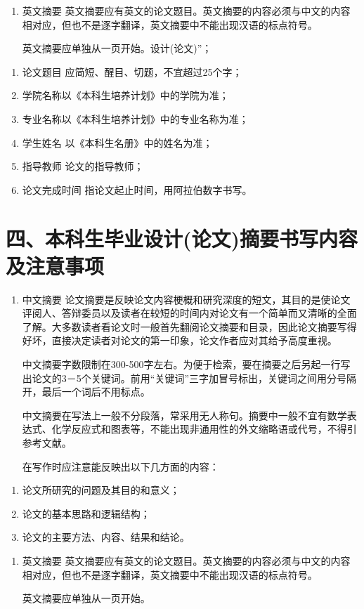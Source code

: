 \documentclass{cupb-thesis}
\begin{document}
\begin{enumerate}[label=\arabic*.]
  \item 英文摘要
英文摘要应有英文的论文题目。英文摘要的内容必须与中文的内容相对应，但也不是逐字翻译，英文摘要中不能出现汉语的标点符号。

英文摘要应单独从一页开始。设计(论文)”；

\end{enumerate}
\begin{enumerate}[label=（\arabic*）]
  \item 论文题目    应简短、醒目、切题，不宜超过25个字；
  \item 学院名称以《本科生培养计划》中的学院为准；
  \item 专业名称以《本科生培养计划》中的专业名称为准；
  \item 学生姓名    以《本科生名册》中的姓名为准；
  \item 指导教师    论文的指导教师；
  \item 论文完成时间    指论文起止时间，用阿拉伯数字书写。
\end{enumerate}
\section{四、本科生毕业设计(论文)摘要书写内容及注意事项}

\begin{enumerate}[label=\arabic*.]
  \item 中文摘要
论文摘要是反映论文内容梗概和研究深度的短文，其目的是使论文评阅人、答辩委员以及读者在较短的时间内对论文有一个简单而又清晰的全面了解。大多数读者看论文时一般首先翻阅论文摘要和目录，因此论文摘要写得好坏，直接决定读者对论文的第一印象，论文作者应对其给予高度重视。

中文摘要字数限制在300-500字左右。为便于检索，要在摘要之后另起一行写出论文的3－5个关键词。前用“关键词”三字加冒号标出，关键词之间用分号隔开，最后一个词后不用标点。

中文摘要在写法上一般不分段落，常采用无人称句。摘要中一般不宜有数学表达式、化学反应式和图表等，不能出现非通用性的外文缩略语或代号，不得引参考文献。

在写作时应注意能反映出以下几方面的内容：

\end{enumerate}
\begin{enumerate}[label=（\arabic*）]
  \item 论文所研究的问题及其目的和意义；
  \item 论文的基本思路和逻辑结构；
  \item 论文的主要方法、内容、结果和结论。
\end{enumerate}
\begin{enumerate}[label=\arabic*.]
  \item 英文摘要
英文摘要应有英文的论文题目。英文摘要的内容必须与中文的内容相对应，但也不是逐字翻译，英文摘要中不能出现汉语的标点符号。

英文摘要应单独从一页开始。

\end{enumerate}
\end{document}

